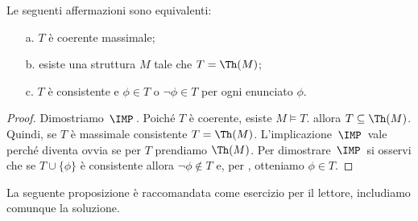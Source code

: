 \begin{proposition}\label{fattoconsistenzasen4sostretto}
Le seguenti affermazioni sono equivalenti:
\begin{itemize}
\item[a.] $T$ \`e coerente massimale;
\item[b.] esiste una struttura $M$ tale che $T=\Th(M)$;
\item[c.] $T$ \`e consistente e $\phi\in T$ o $\neg\phi\in T$ per ogni enunciato $\phi$.
\end{itemize}
\end{proposition}
\begin{proof}
Dimostriamo $\,\IMP\,$. Poich\'e $T$ \`e coerente, esiste $M\models T$. allora $T\subseteq\Th (M)$. Quindi, se $T$ \`e massimale consistente $T=\Th(M)$. L'implicazione $\,\IMP\,$ vale perch\'e  diventa ovvia se per $T$ prendiamo $\Th(M)$.  Per dimostrare $\,\IMP\,$ si osservi che se $T\cup\{\phi\}$ \`e consistente allora $\neg\phi\not\in T$ e, per , otteniamo $\phi\in T$.
\end{proof}

La seguente proposizione \`e raccomandata come esercizio per il lettore, includiamo comunque la soluzione.  

